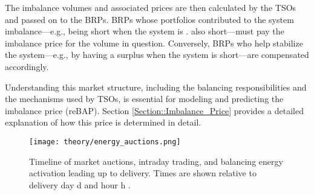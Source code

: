 \documentclass[class=scrbook, crop=false]{standalone}
\begin{document}
The imbalance volumes and associated prices are then calculated by the TSOs and passed on to the BRPs. BRPs whose portfolios contributed to the system imbalance—e.g., being short when the system is . also short—must pay the imbalance price for the volume in question. Conversely, BRPs who help stabilize the system—e.g., by having a surplus when the system is short—are compensated accordingly. 

Understanding this market structure, including the balancing responsibilities and the mechanisms used by  TSOs, is essential for modeling and predicting the imbalance price (reBAP). Section \ref{Section::Imbalance_Price} provides a detailed explanation of how this price is determined in detail. 





\begin{figure}[ht]
            \centering
            \texttt{[image: theory/energy\_auctions.png]}
            \caption[Timeschedule for energy market auctions]{Timeline of market auctions, intraday trading, and balancing energy activation leading up to delivery. Times are shown relative to delivery day 
d and hour 
h \cite{narajewskiProbabilisticForecastingGerman2022}.}
            \label{fig::energy_auctions}
 \end{figure}
\end{document}
